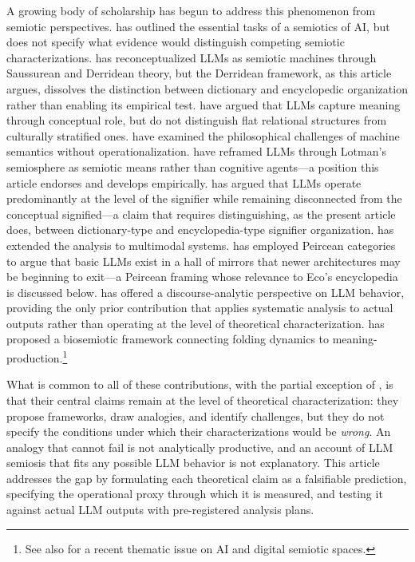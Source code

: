 \documentclass[12pt,a4paper]{article}
\begin{document}
A growing body of scholarship has begun to address this phenomenon from semiotic
perspectives. \citet{Leone2023} has outlined the essential tasks of a semiotics
of AI, but does not specify what evidence would distinguish competing semiotic
characterizations. \citet{Vromen2024} has reconceptualized LLMs as semiotic
machines through Saussurean and Derridean theory, but the Derridean framework,
as this article argues, dissolves the distinction between dictionary and
encyclopedic organization rather than enabling its empirical test.
\citet{PiantadosiHill2022} have argued that LLMs capture meaning through
conceptual role, but do not distinguish flat relational structures from
culturally stratified ones. \citet{NunesAntunes2024} have examined the
philosophical challenges of machine semantics without operationalization.
\citet{NotMinds2025} have reframed LLMs through Lotman's semiosphere as
semiotic means rather than cognitive agents---a position this article
endorses and develops empirically. \citet{LSM2025} has argued that LLMs
operate predominantly at the level of the signifier while remaining
disconnected from the conceptual signified---a claim that requires
distinguishing, as the present article does, between dictionary-type and
encyclopedia-type signifier organization. \citet{Tomalin2025} has extended
the analysis to multimodal systems. \citet{HallMirrors2026} has employed
Peircean categories to argue that basic LLMs exist in a hall of mirrors
that newer architectures may be beginning to exit---a Peircean framing
whose relevance to Eco's encyclopedia is discussed below. \citet{Bateman2024}
has offered a discourse-analytic perspective on LLM behavior, providing the
only prior contribution that applies systematic analysis to actual outputs
rather than operating at the level of theoretical characterization.
\citet{LackovaBennett2025} has proposed a biosemiotic framework connecting
folding dynamics to meaning-production.\footnote{See also \citet{Signata2025}
for a recent thematic issue on AI and digital semiotic spaces.}

What is common to all of these contributions, with the partial exception of
\citet{Bateman2024}, is that their central claims remain at the level of
theoretical characterization: they propose frameworks, draw analogies, and
identify challenges, but they do not specify the conditions under which
their characterizations would be \emph{wrong}. An analogy that cannot fail
is not analytically productive, and an account of LLM semiosis that fits
any possible LLM behavior is not explanatory. This article addresses the
gap by formulating each theoretical claim as a falsifiable prediction,
specifying the operational proxy through which it is measured, and testing
it against actual LLM outputs with pre-registered analysis plans.
\end{document}

